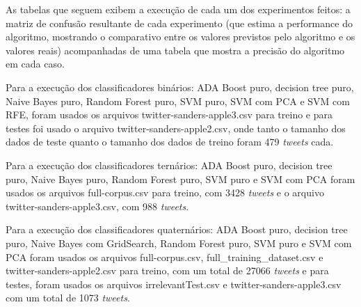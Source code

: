 
As tabelas que seguem exibem a execução de cada um dos experimentos feitos: a matriz de confusão resultante de cada experimento (que estima a performance do algoritmo, mostrando o comparativo entre os valores previstos pelo algoritmo e os valores reais) acompanhadas de uma tabela que mostra a precisão do algoritmo em cada caso.

Para a execução dos classificadores binários:  ADA Boost puro, decision tree puro, Naive Bayes puro, Random Forest puro, SVM puro, SVM com PCA e SVM com RFE, foram usados os arquivos twitter-sanders-apple3.csv para treino e para testes foi usado o arquivo twitter-sanders-apple2.csv, onde tanto o tamanho dos dados de teste quanto o tamanho dos dados de treino foram 479 \emph{tweets} cada.

Para a execução dos classificadores ternários:  ADA Boost puro, decision tree puro, Naive Bayes puro, Random Forest puro, SVM puro e SVM com PCA foram usados os arquivos full-corpus.csv para treino, com 3428 \emph{tweets} e o arquivo twitter-sanders-apple3.csv, com 988 \emph{tweets}.

Para a execução dos classificadores quaternários: ADA Boost puro, decision tree puro, Naive Bayes com GridSearch, Random Forest puro, SVM puro e SVM com PCA foram usados os arquivos full-corpus.csv, full\_training\_dataset.csv e twitter-sanders-apple2.csv para treino, com um total de 27066 \emph{tweets} e para testes, foram usados os arquivos irrelevantTest.csv e twitter-sanders-apple3.csv com um total de 1073 \emph{tweets}.


